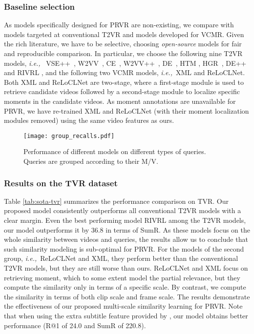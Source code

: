 \documentclass[sigconf]{acmart}
\newcommand{\ie}{\emph{i.e.,}~}
\begin{document}
\subsubsection{Baseline selection}
As models specifically designed for PRVR are non-existing, we compare with models targeted at conventional T2VR and models developed for VCMR.
Given the rich literature, we have to be selective, choosing \emph{open-source} models for fair and reproducible comparison. In particular, we choose the following nine T2VR models, \ie 
VSE++~\cite{faghri2017vse++}, W2VV~\cite{dong2018predicting}, CE~\cite{liu2019use}, W2VV++~\cite{li2019w2vv++}, DE~\cite{dong2019dual}, HTM \cite{miech2019howto100m}, HGR~\cite{chen2020fine}, DE++~\cite{dong2021dual} and RIVRL \cite{dong2022reading}, and the following two VCMR models, \ie XML \cite{lei2020tvr} and ReLoCLNet\cite{zhang2021video}.
Both XML and ReLoCLNet are two-stage, where a first-stage module is used to retrieve candidate videos followed by a second-stage module to localize specific moments in the candidate videos. As moment annotations are unavailable for PRVR, we have re-trained XML and ReLoCLNet (with their moment localization modules removed) using the same video features as ours.


\begin{figure*}[tb!]
\centering\texttt{[image: group\_recalls.pdf]}
\vspace{-4mm}
\caption{Performance of different models on different types of queries. Queries are grouped according to their M/V.
}\label{fig:group_recalls}
\end{figure*}


\subsubsection{Results on the TVR dataset}

Table \ref{tab:sota-tvr} summarizes the performance comparison on TVR.
Our proposed model consistently outperforms all conventional T2VR models with a clear margin. Even the best performing model RIVRL among the T2VR models, our model outperforms it by 36.8 in terms of SumR.
As these models focus on the whole similarity between videos and queries, the results allow us to conclude that such similarity modeling is sub-optimal for PRVR.
For the models of the second group, \ie ReLoCLNet and XML, they perform better than the conventional T2VR models, but they are still worse than ours. 
ReLoCLNet and XML focus on retrieving moment, which to some extent model the partial relevance, but they compute the similarity only in terms of a specific scale. By contrast, we compute the similarity in terms of both clip scale and frame scale. The results demonstrate the effectiveness of our proposed multi-scale similarity learning for PRVR.
Note that when using the extra subtitle feature provided by \cite{lei2020tvr}, our model obtains better performance (R@1 of 24.0 and SumR of 220.8).
\end{document}
